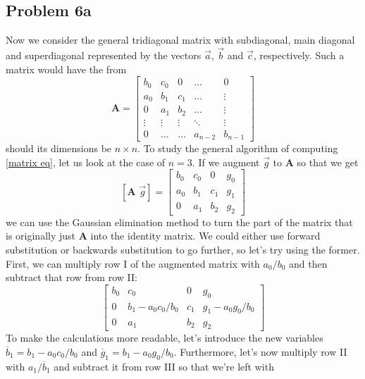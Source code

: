\documentclass[english,notitlepage]{revtex4-1}  %
\begin{document}
\subsection*{Problem 6a}
Now we consider the general tridiagonal matrix with subdiagonal, main diagonal and superdiagonal represented by the vectors $\vec{a}$, $\vec{b}$ and $\vec{c}$, respectively. Such a matrix would have the from
\begin{equation}
    \textbf{A} = \begin{bmatrix}
        b_0 & c_0 & 0 & \ldots & 0 \\
        a_0 & b_1 & c_1 & \ldots & \vdots\\
        0 & a_1 & b_2 & \ldots & \vdots\\
        \vdots&\vdots&\vdots&\ddots&\vdots\\
        0 & \ldots & \ldots & a_{n-2} & b_{n-1} 
    \end{bmatrix}
\end{equation}
should its dimensions be $n \times n$. To study the general algorithm of computing \cref{matrix eq}, let us look at the case of $n = 3$. If we augment $\vec{g}$ to $\textbf{A}$ so that we get
\begin{equation}
    \left[\textbf{A }\vec{g}\right] = \begin{bmatrix}
        b_0 & c_0 & 0 & g_0 \\
        a_0 & b_1 & c_1 & g_1 \\
        0 & a_1 & b_2 & g_2 
    \end{bmatrix}
\end{equation}
we can use the Gaussian elimination method to turn the part of the matrix that is originally just $\textbf{A}$ into the identity matrix. We could either use forward substitution or backwards substitution to go further, so let's try using the former. First, we can multiply row I of the augmented matrix with $a_0/b_0$ and then subtract that row from row II:
\begin{equation}
    \begin{bmatrix}
        b_0 & c_0 & 0 & g_0 \\
        0 & b_1 - a_0c_0/b_0 & c_1 & g_1 - a_0g_0/b_0 \\
        0 & a_1 & b_2 & g_2 
    \end{bmatrix}
\end{equation}
To make the calculations more readable, let's introduce the new variables $\overline{b}_1 = b_1 - a_0c_0/b_0$ and $\overline{g}_1 = b_1 - a_0g_0/b_0$. Furthermore, let's now multiply row II with $a_1/\overline{b}_1$ and subtract it from row III so that we're left with
\end{document}

